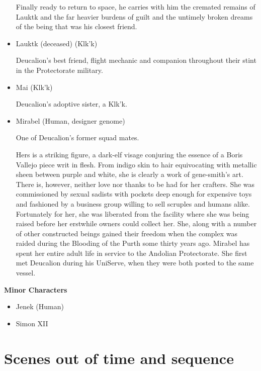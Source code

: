 \begin{itemize}
Finally ready to return to space, he carries with him the cremated
remains of Lauktk and the far heavier burdens of guilt and the
untimely broken dreams of the being that was his closest friend.

\item Lauktk (deceased) (Klk'k) 

Deucalion's best friend, flight mechanic and
companion throughout their stint in the Protectorate military.

\item Mai (Klk'k)

Deucalion's adoptive sister, a Klk'k.

\item Mirabel (Human, designer genome)

One of Deucalion's former squad mates. 

Hers is a striking figure, a dark-elf visage conjuring the essence of
a Boris Vallejo piece writ in flesh. From indigo skin to hair
equivocating with metallic sheen between purple and white, she is
clearly a work of gene-smith's art. There is, however, neither love
nor thanks to be had for her crafters. She was commissioned by sexual
sadists with pockets deep enough for expensive toys and fashioned by a
business group willing to sell scruples and humans alike. Fortunately
for her, she was liberated from the facility where she was being
raised before her erstwhile owners could collect her. She, along with
a number of other constructed beings gained their freedom when the
complex was raided during the Blooding of the Purth some thirty years
ago. Mirabel has spent her entire adult life in service to the
Andolian Protectorate. She first met Deucalion during his UniServe,
when they were both posted to the same vessel.
\end{itemize}

{\bf Minor Characters}

\begin{itemize}
\item Jenek (Human) 

\item Simon XII
\end{itemize}

\section{Scenes out of time and sequence}

